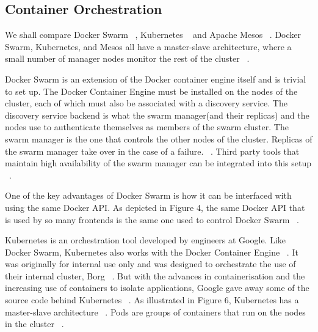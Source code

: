 \documentclass[10pt,twocolumn]{article}
\begin{document}
\subsection{Container Orchestration}

We shall compare Docker Swarm ~\cite{docker_swarm}, Kubernetes ~\cite{kubernetes} and Apache Mesos ~\cite{mesos}.
Docker Swarm, Kubernetes, and Mesos all have a master-slave architecture, where a small number of manager nodes monitor the rest of the cluster ~\cite{docker_swarm, kubernetes, mesos}.

Docker Swarm is an extension of the Docker container engine itself and is trivial to set up.
The Docker Container Engine must be installed on the nodes of the cluster, each of which must also be associated with a discovery service.
The discovery service backend is what the swarm manager(and their replicas) and the nodes use to authenticate themselves as members of the swarm cluster.
The swarm manager is the one that controls the other nodes of the cluster.
Replicas of the swarm manager take over in the case of a failure. ~\cite{docker_swarm}.
Third party tools that maintain high availability of the swarm manager can be integrated into this setup ~\cite{platform9_dockerswarm_kubernetes}.

One of the key advantages of Docker Swarm is how it can be interfaced with using the same Docker API.
As depicted in Figure 4, the same Docker API that is used by so many frontends is the same one used to control Docker Swarm ~\cite{platform9_dockerswarm_kubernetes}.

Kubernetes is an orchestration tool developed by engineers at Google.
Like Docker Swarm, Kubernetes also works with the Docker Container Engine ~\cite{kubernetes}.
It was originally for internal use only and was designed to orchestrate the use of their internal cluster, Borg ~\cite{borg}.
But with the advances in containerisation and the increasing use of containers to isolate applications, Google gave away some of the source code behind Kubernetes ~\cite{kubernetes_github}.
As illustrated in Figure 6, Kubernetes has a master-slave architecture ~\cite{platform9_dockerswarm_kubernetes}.
Pods are groups of containers that run on the nodes in the cluster ~\cite{kubernetes}.
\end{document}
